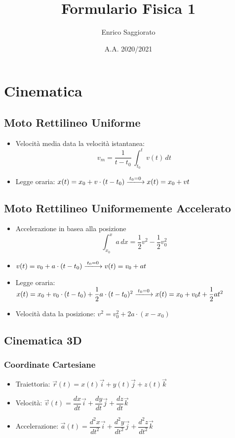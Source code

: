\documentclass[10pt,a4paper]{article}
\title{Formulario Fisica 1}
\date{A.A. 2020/2021}
\author{Enrico Saggiorato}
\newcommand{\deriv}[2][t]{\dfrac{d{#2}}{d{#1}}}
\newcommand{\derivtwo}[2][t]{\dfrac{d^2{#2}}{d{#1}^2}}
\begin{document}
    \begin{titlepage}
    \maketitle
    \end{titlepage}


      \section{Cinematica}
      \subsection{Moto Rettilineo Uniforme}
      \begin{itemize}
  	\item Velocità media data la velocità istantanea:
  	\[
  	v_m = \dfrac{1}{t-t_0} \, \int_{t_0}^{t} v(t) \,dt
  	\]
  	\item Legge oraria: \( x(t) = x_0 + v\cdot(t-t_0) \xlongrightarrow{ t_0 = 0 \,}  x(t) = x_0 + vt  \)
      \end{itemize}
	
	\vspace{5mm}
	\subsection{Moto Rettilineo Uniformemente Accelerato}
	\begin{itemize}
	\item Accelerazione in basea alla posizione
	\[
	\int_{x_0}^x a \,dx = \dfrac{1}{2}v^2 - \dfrac{1}{2}v_0^2  
	\]
	\item \( v(t) = v_0 + a\cdot(t - t_0) \xlongrightarrow{ t_0 = 0 \,} v(t) = v_0 + at \)
	\item Legge oraria: \( x(t) = x_0 + v_0\cdot(t-t_0) + \dfrac{1}{2}a\cdot (t-t_0)^2 
		\xlongrightarrow{ t_0 = 0 \,} x(t) = x_0 + v_0t+ \dfrac{1}{2}at^2\)
	\item Velocità data la posizione: \( v^2 = v_0^2 +2a\cdot(x-x_0) \)
	\end{itemize}

	\vspace{5mm}
	\subsection{Cinematica 3D}
	\subsubsection{Coordinate Cartesiane}
	\begin{itemize}
	\item Traiettoria: \( \vec{r}(t) = x(t)\vec{i} + y(t)\vec{j} + z(t)\vec{k} \)
	\item Velocità: \( \vec{v}(t) = \deriv{x}\vec{i} + \deriv{y}\vec{j} + \deriv{z}\vec{k} \)
	\item Accelerazione: \( \vec{a}(t) = \derivtwo{x}\vec{i} + \derivtwo{y}\vec{j} + \derivtwo{z}\vec{k} \)
	\end{itemize}
\end{document}
